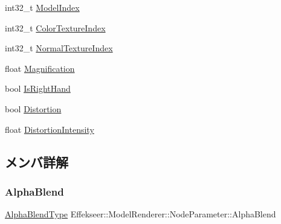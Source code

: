 \begin{DoxyCompactItemize}
\item 
int32\+\_\+t \mbox{\hyperlink{struct_effekseer_1_1_model_renderer_1_1_node_parameter_a8d90f2d66294e2005cc737afbfa97dea}{Model\+Index}}
\item 
int32\+\_\+t \mbox{\hyperlink{struct_effekseer_1_1_model_renderer_1_1_node_parameter_abdfcf0e63df9aff535effe2eaedfbdd3}{Color\+Texture\+Index}}
\item 
int32\+\_\+t \mbox{\hyperlink{struct_effekseer_1_1_model_renderer_1_1_node_parameter_abad17228020f70a3f2ac1d05c25f73ac}{Normal\+Texture\+Index}}
\item 
float \mbox{\hyperlink{struct_effekseer_1_1_model_renderer_1_1_node_parameter_a2795f9c10fd867586eaf942ddb772364}{Magnification}}
\item 
bool \mbox{\hyperlink{struct_effekseer_1_1_model_renderer_1_1_node_parameter_aa6a88952b1eb5e94d718a8523a1082fc}{Is\+Right\+Hand}}
\item 
bool \mbox{\hyperlink{struct_effekseer_1_1_model_renderer_1_1_node_parameter_adb4920c1697cfdee2cd7fff84a7ebc11}{Distortion}}
\item 
float \mbox{\hyperlink{struct_effekseer_1_1_model_renderer_1_1_node_parameter_aebe9d866f67f827bcd6fcba2721f57ac}{Distortion\+Intensity}}
\end{DoxyCompactItemize}


\subsection{メンバ詳解}
\mbox{\label{struct_effekseer_1_1_model_renderer_1_1_node_parameter_a412adbcede66578e67fc52338df61843}} 
\subsubsection{\texorpdfstring{Alpha\+Blend}{AlphaBlend}}
{\footnotesize\ttfamily \mbox{\hyperlink{namespace_effekseer_a8c32fd5b7ec7feed73314b2ae8086949}{Alpha\+Blend\+Type}} Effekseer\+::\+Model\+Renderer\+::\+Node\+Parameter\+::\+Alpha\+Blend}

\mbox{\label{struct_effekseer_1_1_model_renderer_1_1_node_parameter_abdfcf0e63df9aff535effe2eaedfbdd3}} 
